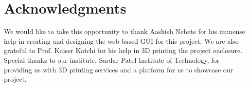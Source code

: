 \documentclass[journal]{IEEEtran}
\begin{document}
\section*{Acknowledgments}

We would like to take this opportunity to thank Aashish Nehete for his immense help in creating and designing the web-based GUI for this project. We are also grateful to Prof. Kaiser Katchi for his help in 3D printing the project enclosure.
Special thanks to our institute, Sardar Patel Institute of Technology, for providing us with 3D printing services and a platform for us to showcase our project.


\ifCLASSOPTIONcaptionsoff
  \newpage
\fi




\end{document}
